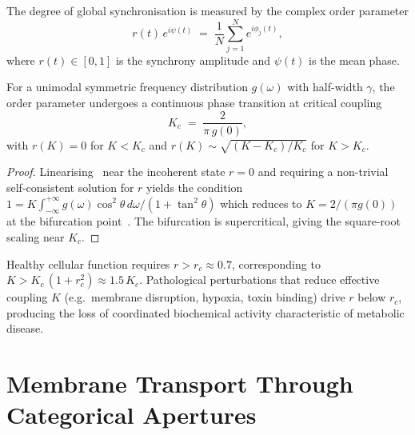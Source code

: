 \begin{definition}
\label{def:ch03-order-param}
The degree of global synchronisation is measured by the complex order
parameter
\begin{equation}
    r(t)\,e^{i\psi(t)}
    \;=\;
    \frac{1}{N}\sum_{j=1}^{N} e^{i\phi_j(t)},
    \label{eq:ch03-order-param}
\end{equation}
where $r(t)\in[0,1]$ is the synchrony amplitude and $\psi(t)$ is the mean
phase.
\end{definition}

\begin{theorem}
\label{thm:ch03-sync-transition}
For a unimodal symmetric frequency distribution $g(\omega)$ with half-width
$\gamma$, the order parameter undergoes a continuous phase transition at
critical coupling
\begin{equation}
    K_c \;=\; \frac{2}{\pi\,g(0)},
    \label{eq:ch03-Kc}
\end{equation}
with $r(K)=0$ for $K<K_c$ and $r(K)\sim\sqrt{(K-K_c)/K_c}$ for $K>K_c$.
\end{theorem}

\begin{proof}
Linearising~ near the incoherent state $r=0$ and
requiring a non-trivial self-consistent solution for $r$ yields the condition
$1=K\int_{-\infty}^{+\infty}g(\omega)\cos^2\theta\,d\omega/(1+\tan^2\theta)$
which reduces to $K=2/(\pi g(0))$ at the bifurcation
point~\citep{strogatz2000kuramoto}.  The bifurcation is supercritical, giving
the square-root scaling near $K_c$.
\end{proof}

\begin{corollary}
\label{cor:ch03-disease-desync}
Healthy cellular function requires $r>r_c\approx 0.7$, corresponding to
$K>K_c\,(1+r_c^2)\approx 1.5\,K_c$.  Pathological perturbations that reduce
effective coupling $K$ (e.g.\ membrane disruption, hypoxia, toxin binding)
drive $r$ below $r_c$, producing the loss of coordinated biochemical activity
characteristic of metabolic disease.
\end{corollary}

\section{Membrane Transport Through Categorical Apertures}
\label{sec:ch03-membrane-transport}

